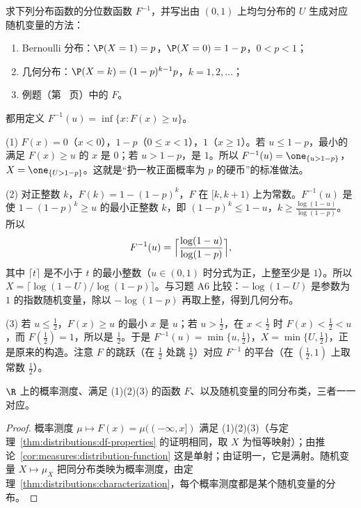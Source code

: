 \begin{workedexample}\label{we:distributions:quantile}
求下列分布函数的分位数函数 $F^{-1}$，并写出由 $(0,1)$ 上均匀分布的 $U$ 生成对应随机变量的方法：
\begin{enumerate}
\item Bernoulli 分布：$\P(X=1)=p$，$\P(X=0)=1-p$，$0<p<1$；
\item 几何分布：$\P(X=k)=(1-p)^{k-1}p$，$k=1,2,\dots$；
\item 例题（第~\pageref{we:distributions:mixed} 页）中的 $F$。
\end{enumerate}
\end{workedexample}
\begin{solution}
都用定义 $F^{-1}(u)=\inf\{x:F(x)\geqslant u\}$。

(1) $F(x)=0$（$x<0$），$1-p$（$0\leqslant x<1$），$1$（$x\geqslant1$）。若 $u\leqslant1-p$，最小的满足 $F(x)\geqslant u$ 的 $x$ 是 $0$；若 $u>1-p$，是 $1$。所以 $F^{-1}(u)=\one_{\{u>1-p\}}$，$X=\one_{\{U>1-p\}}$。这就是“扔一枚正面概率为 $p$ 的硬币”的标准做法。

(2) 对正整数 $k$，$F(k)=1-(1-p)^k$，$F$ 在 $[k,k+1)$ 上为常数。$F^{-1}(u)$ 是使 $1-(1-p)^k\geqslant u$ 的最小正整数 $k$，即 $(1-p)^k\leqslant1-u$，$k\geqslant\frac{\log(1-u)}{\log(1-p)}$。所以
\[
F^{-1}(u)=\Bigl\lceil\frac{\log(1-u)}{\log(1-p)}\Bigr\rceil ,
\]
其中 $\lceil t\rceil$ 是不小于 $t$ 的最小整数（$u\in(0,1)$ 时分式为正，上整至少是 $1$）。所以 $X=\lceil\log(1-U)/\log(1-p)\rceil$。与习题 A6 比较：$-\log(1-U)$ 是参数为 $1$ 的指数随机变量，除以 $-\log(1-p)$ 再取上整，得到几何分布。

(3) 若 $u\leqslant\frac12$，$F(x)\geqslant u$ 的最小 $x$ 是 $u$；若 $u>\frac12$，在 $x<\frac12$ 时 $F(x)<\frac12<u$，而 $F(\frac12)=1$，所以是 $\frac12$。于是 $F^{-1}(u)=\min\{u,\frac12\}$，$X=\min\{U,\frac12\}$，正是原来的构造。注意 $F$ 的跳跃（在 $\frac12$ 处跳 $\frac12$）对应 $F^{-1}$ 的平台（在 $(\frac12,1)$ 上取常数 $\frac12$）。
\end{solution}

\begin{corollary}
$\R$ 上的概率测度、满足 (1)(2)(3) 的函数 $F$、以及随机变量的同分布类，三者一一对应。
\end{corollary}
\begin{proof}
概率测度 $\mu\mapsto F(x)=\mu((-\infty,x])$ 满足 (1)(2)(3)（与定理~\ref{thm:distributions:df-properties} 的证明相同，取 $X$ 为恒等映射）；由推论~\ref{cor:measures:distribution-function} 这是单射；由证明一，它是满射。随机变量 $X\mapsto\mu_X$ 把同分布类映为概率测度，由定理~\ref{thm:distributions:characterization}，每个概率测度都是某个随机变量的分布。
\end{proof}

